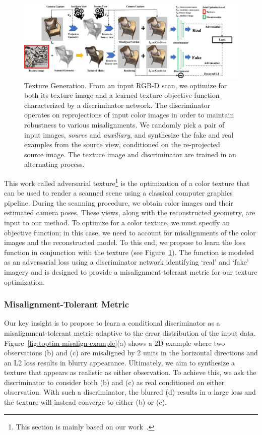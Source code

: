\begin{figure}
    \centering
    \includegraphics[width=\linewidth]{texturegen/figures/pipeline.png}
    \caption{Texture Generation. 
    From an input RGB-D scan, we optimize for both its texture image and a learned texture objective function characterized by a discriminator network. 
    The discriminator operates on reprojections of input color images in order to maintain robustness to various misalignments.
    We randomly pick a pair of input images, \emph{source} and \emph{auxiliary}, and synthesize the fake and real examples from the source view, conditioned on the re-projected source image. 
    The texture image and discriminator are trained in an alternating process.}
    \label{fig:toptim-pipeline}
\end{figure}
This work called adversarial texture\footnote{This section is mainly based on our work~\cite{huang2020adversarial}.} is the optimization of a color texture that can be used to render a scanned scene using a classical computer graphics pipeline.
%
During the scanning procedure, we obtain color images and their estimated camera poses.
%
These views, along with the reconstructed geometry, are input to our method.
%
To optimize for a color texture, we must specify an objective function; in this case, we need to account for misalignments of the color images and the reconstructed model.
%
To this end, we propose to learn the loss function in conjunction with the texture (see Figure~\ref{fig:toptim-pipeline}).
%
The function is modeled as an adversarial loss using a discriminator network identifying `real' and `fake' imagery and is designed to provide a misalignment-tolerant metric for our texture optimization.
%

\subsubsection{Misalignment-Tolerant Metric}
\label{sec:approach-misalign}



%
Our key insight is to propose to learn a conditional discriminator as a misalignment-tolerant metric adaptive to the error distribution of the input data.
%
Figure~\ref{fig:toptim-misalign-example}(a) shows a 2D example where two observations (b) and (c) are misaligned by 2 units in the horizontal directions and an L2 loss results in blurry appearance.
%
Ultimately, we aim to synthesize a texture that appears as realistic as either observation.
%
To achieve this, we ask the discriminator to consider both (b) and (c) as real conditioned on either observation.
%
With such a discriminator, the blurred (d) results in a large loss and the texture will instead converge to either (b) or (c).
%

